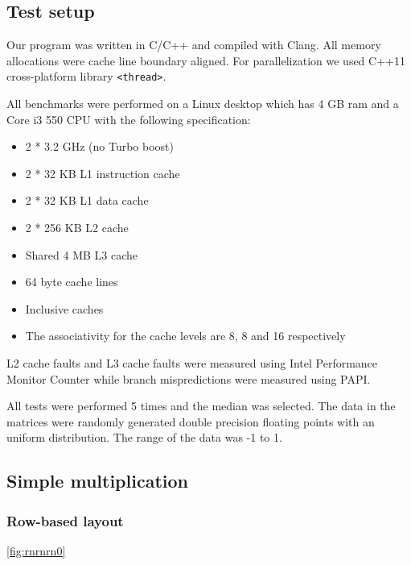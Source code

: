 \subsection{Test setup}

Our program was written in C/C++ and compiled with Clang. All memory allocations were cache line boundary aligned. For parallelization we used C++11 cross-platform library \texttt{<thread>}.

All benchmarks were performed on a Linux desktop which has 4 GB ram and a Core i3 550 CPU with the following specification:

\begin{itemize}
\item 2 * 3.2 GHz (no Turbo boost)
\item 2 * 32 KB L1 instruction cache
\item 2 * 32 KB L1 data cache
\item 2 * 256 KB L2 cache
\item Shared 4 MB L3 cache
\item 64 byte cache lines
\item Inclusive caches
\item The associativity for the cache levels are 8, 8 and 16 respectively
\end{itemize}

L2 cache faults and L3 cache faults were measured using Intel Performance Monitor Counter while branch mispredictions were measured using PAPI.

All tests were performed 5 times and the median was selected. The data in the matrices were randomly generated double precision floating points with
an uniform distribution. The range of the data was -1 to
1.

\subsection{Simple multiplication}

\subsubsection{Row-based layout}

\ref{fig:rnrnrn0}


